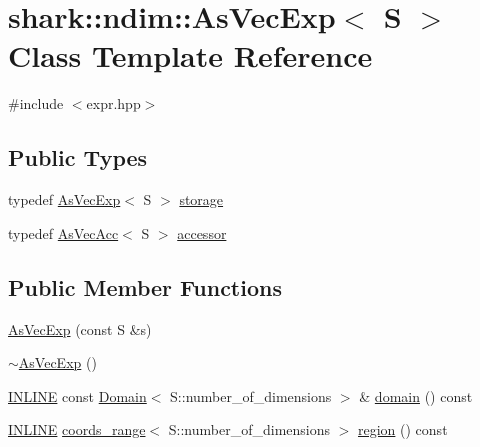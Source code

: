 \hypertarget{classshark_1_1ndim_1_1_as_vec_exp_3_01_s_01_4}{}\section{shark\+:\+:ndim\+:\+:As\+Vec\+Exp$<$ S $>$ Class Template Reference}
\label{classshark_1_1ndim_1_1_as_vec_exp_3_01_s_01_4}


{\ttfamily \#include $<$expr.\+hpp$>$}

\subsection*{Public Types}
\begin{DoxyCompactItemize}
\item 
typedef \hyperlink{classshark_1_1ndim_1_1_as_vec_exp}{As\+Vec\+Exp}$<$ S $>$ \hyperlink{classshark_1_1ndim_1_1_as_vec_exp_3_01_s_01_4_a3ffb3edaef06af8cd87597334cad8f21}{storage}
\item 
typedef \hyperlink{classshark_1_1ndim_1_1_as_vec_acc}{As\+Vec\+Acc}$<$ S $>$ \hyperlink{classshark_1_1ndim_1_1_as_vec_exp_3_01_s_01_4_a94453f3532458ea9d9ff0137be5bf4b5}{accessor}
\end{DoxyCompactItemize}
\subsection*{Public Member Functions}
\begin{DoxyCompactItemize}
\item 
\hyperlink{classshark_1_1ndim_1_1_as_vec_exp_3_01_s_01_4_a1900f5353d7b7d0f644d847cf4b1180c}{As\+Vec\+Exp} (const S \&s)
\item 
\hyperlink{classshark_1_1ndim_1_1_as_vec_exp_3_01_s_01_4_a15a9ebc60ced3a8970ad307360936d69}{$\sim$\+As\+Vec\+Exp} ()
\item 
\hyperlink{common_8hpp_a2eb6f9e0395b47b8d5e3eeae4fe0c116}{I\+N\+L\+I\+NE} const \hyperlink{classshark_1_1ndim_1_1_domain}{Domain}$<$ S\+::number\+\_\+of\+\_\+dimensions $>$ \& \hyperlink{classshark_1_1ndim_1_1_as_vec_exp_3_01_s_01_4_af27cbff34db3e241f3ebeb84d7afd54c}{domain} () const
\item 
\hyperlink{common_8hpp_a2eb6f9e0395b47b8d5e3eeae4fe0c116}{I\+N\+L\+I\+NE} \hyperlink{structshark_1_1ndim_1_1coords__range}{coords\+\_\+range}$<$ S\+::number\+\_\+of\+\_\+dimensions $>$ \hyperlink{classshark_1_1ndim_1_1_as_vec_exp_3_01_s_01_4_a4bd07e8162063ac80052ded4bd3f24fe}{region} () const
\end{DoxyCompactItemize}
